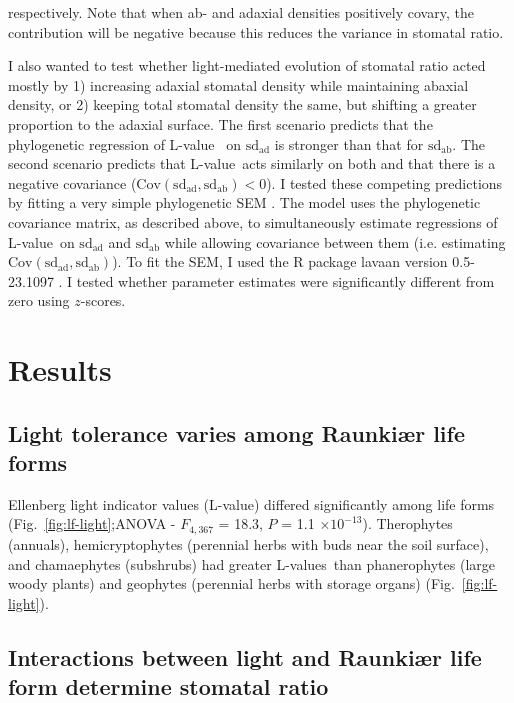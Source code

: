 \documentclass[12pt, oneside]{article}
\newcommand{\pkg}[1]{{\fontseries{b}\selectfont #1}}
\newcommand{\el}{L-value}
\newcommand{\els}{L-values}
\begin{document}
respectively. Note that when ab- and adaxial densities positively covary, the contribution will be negative because this reduces the variance in stomatal ratio.

I also wanted to test whether light-mediated evolution of stomatal ratio acted mostly by 1) increasing adaxial stomatal density while maintaining abaxial density, or 2) keeping total stomatal density the same, but shifting a greater proportion to the adaxial surface. The first scenario predicts that the phylogenetic regression of \el~ on $\mathrm{sd_{ad}}$ is stronger than that for $\mathrm{sd_{ab}}$. The second scenario predicts that \el~acts similarly on both and that there is a negative covariance ($\mathrm{Cov(sd_{ad}, sd_{ab}) < 0}$). I tested these competing predictions by fitting a very simple phylogenetic SEM \citep[see][for a similar approach]{Mason_etal_2016}. The model uses the phylogenetic covariance matrix, as described above, to simultaneously estimate regressions of \el~on $\mathrm{sd_{ad}}$ and $\mathrm{sd_{ab}}$ while allowing covariance between them (i.e. estimating $\mathrm{Cov(sd_{ad}, sd_{ab})}$). To fit the SEM, I used the R package \pkg{lavaan} version 0.5-23.1097 \citep{Rosseel_2012}. I tested whether parameter estimates were significantly different from zero using $z$-scores.


\section*{Results}

\subsection*{Light tolerance varies among Raunki\ae r life forms}

Ellenberg light indicator values (\el) differed significantly among life forms (Fig.~\ref{fig:lf-light};ANOVA - $F_{4, 367}$ = 18.3, $P$ = 1.1 $\times10^{-13}$). Therophytes (annuals), hemicryptophytes (perennial herbs with buds near the soil surface), and chamaephytes (subshrubs) had greater \els~than phanerophytes (large woody plants) and geophytes (perennial herbs with storage organs) (Fig.~\ref{fig:lf-light}).

\subsection*{Interactions between light and Raunki\ae r life form determine stomatal ratio}
\end{document}
